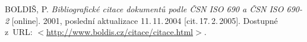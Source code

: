 \begin{literatura}{99}
	
    BOLDIŠ, P.
    \emph{Bibliografické citace dokumentů podle ČSN ISO 690 a ČSN ISO 690-2}\/ [online].
    2001, poslední aktualizace 11.\,11.\,2004 [cit.\,17.\,2.\,2005].
    Dostupné z~URL:
    \(<\)\url{http://www.boldis.cz/citace/citace.html}\(>\).
	
\end{literatura}
